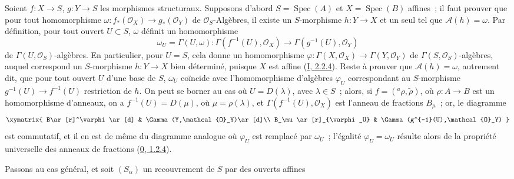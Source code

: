 Soient $f:X\to S$, $g:Y\to S$ les morphismes structuraux. Supposons d'abord
$S=\operatorname{Spec}(A)$ et $X=\operatorname{Spec}(B)$ affines~; il faut
prouver que pour tout homomorphisme
$\omega:f_*(\mathcal{O}_X)\to g_*(\mathcal{O}_Y)$ de
$\mathcal{O}_S$-Algèbres, il existe un $S$-morphisme $h:Y\to X$ et un seul
tel que $\mathcal{A}(h)=\omega$. Par définition, pour tout ouvert $U\subset
S$, $\omega$ définit un homomorphisme
\[
  \omega_U=\Gamma(U,\omega):
  \Gamma(f^{-1}(U),\mathcal{O}_X)\to
  \Gamma(g^{-1}(U),\mathcal{O}_Y)
\]
de $\Gamma(U,\mathcal{O}_S)$-algèbres. En particulier, pour $U=S$, cela
donne un homomorphisme
$\varphi:\Gamma(X,\mathcal{O}_X)\to\Gamma(Y,\mathcal{O}_Y)$ de
$\Gamma(S,\mathcal{O}_S)$-algèbres, auquel correspond un $S$-morphisme
$h:Y\to X$ bien déterminé, puisque $X$ est affine
(\hyperref[I.2.2.4-fr]{I, 2.2.4}). Reste à prouver que
$\mathcal{A}(h)=\omega$, autrement dit, que pour tout ouvert $U$ d'une base
de $S$, $\omega_U$ coïncide avec l'homomorphisme d'algèbres $\varphi_U$
correspondant au $S$-morphisme $g^{-1}(U)\to f^{-1}(U)$ restriction de $h$.
On peut se borner au cas où $U=D(\lambda)$, avec $\lambda\in S$~; alors, si
$f=({}^a\rho,\widetilde{\rho})$, où $\rho:A\to B$ est un homomorphisme
d'anneaux, on a $f^{-1}(U)=D(\mu)$, où $\mu=\rho(\lambda)$, et
$\Gamma(f^{-1}(U),\mathcal{O}_X)$ est l'anneau de fractions $B_\mu$~; or,
le diagramme
\[
  \xymatrix{
    B\ar[r]^\varphi\ar[d] & \Gamma(Y,\mathcal{O}_Y)\ar[d]\\
    B_\mu\ar[r]_{\varphi_U} & \Gamma(g^{-1}(U),\mathcal{O}_Y)
  }
\]
est commutatif, et il en est de même du diagramme analogue où $\varphi_U$
est remplacé par $\omega_U$~; l'égalité $\varphi_U=\omega_U$ résulte alors
de la propriété universelle des anneaux de fractions
(\hyperref[0.1.2.4-fr]{0, 1.2.4}).

Passons au cas général, et soit $(S_\alpha)$ un recouvrement de $S$ par des
ouverts affines
